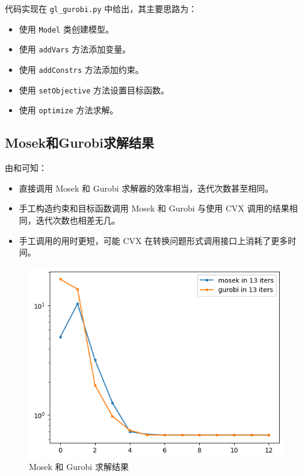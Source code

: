 \documentclass[journal, a4paper]{IEEEtran}
\begin{document}
代码实现在 \texttt{gl\_gurobi.py} 中给出，其主要思路为：
\begin{itemize}
    \item 使用 \texttt{Model} 类创建模型。
    \item 使用 \texttt{addVars} 方法添加变量。
    \item 使用 \texttt{addConstrs} 方法添加约束。
    \item 使用 \texttt{setObjective} 方法设置目标函数。
    \item 使用 \texttt{optimize} 方法求解。
\end{itemize}

\subsection{\textbf{Mosek和Gurobi求解结果}}

由和可知：

\begin{itemize}
    \item 直接调用 Mosek 和 Gurobi 求解器的效率相当，迭代次数甚至相同。
    \item 手工构造约束和目标函数调用 Mosek 和 Gurobi 与使用 CVX 调用的结果相同，迭代次数也相差无几。
    \item 手工调用的用时更短，可能 CVX 在转换问题形式调用接口上消耗了更多时间。
\end{itemize}

\begin{figure}[H]
    \centering
    \includegraphics[width=0.8\columnwidth]{img/mosek-gurobi.png}
    {\centering \small \caption{Mosek 和 Gurobi 求解结果}\label{fig:MosekGurobi}}
    
\end{figure}
\end{document}
